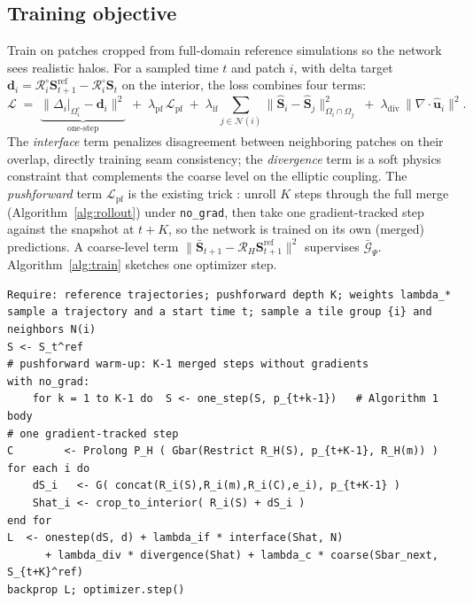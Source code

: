 \documentclass[11pt]{article}
\newcommand{\Rop}{\mathcal{R}}
\newcommand{\Gcoarse}{\bar{\mathcal{G}}_{\Psi}}
\begin{document}
\subsection{Training objective}
Train on patches cropped from full-domain reference simulations so the network
sees realistic halos. For a sampled time $t$ and patch $i$, with delta target
$\bm d_i = \Rop_i^\circ \bm S_{t+1}^{\text{ref}} - \Rop_i^\circ \bm S_t$ on the
interior, the loss combines four terms:
\begin{equation}
\mathcal L \;=\;
\underbrace{\big\| \Delta_i|_{\Omega_i^\circ} - \bm d_i \big\|^2}_{\text{one-step}}
\;+\; \lambda_{\mathrm{pf}}\,\mathcal L_{\mathrm{pf}}
\;+\; \lambda_{\mathrm{if}} \!\!\sum_{j\in\mathcal N(i)}\!\! \big\| \hat{\bm S}_i - \hat{\bm S}_j \big\|^2_{\Omega_i\cap\Omega_j}
\;+\; \lambda_{\mathrm{div}}\, \big\| \nabla\!\cdot\!\hat{\bm u}_i \big\|^2 .
\label{eq:loss}
\end{equation}
The \emph{interface} term penalizes disagreement between neighboring patches on
their overlap, directly training seam consistency; the \emph{divergence} term is
a soft physics constraint that complements the coarse level on the elliptic
coupling. The \emph{pushforward} term $\mathcal L_{\mathrm{pf}}$ is the existing
trick \cite{brandstetter2022mppde}: unroll $K$ steps through the full merge
(Algorithm~\ref{alg:rollout}) under \texttt{no\_grad}, then take one
gradient-tracked step against the snapshot at $t+K$, so the network is trained on
its own (merged) predictions. A coarse-level term
$\|\bar{\bm S}_{t+1}-\Rop_H\bm S_{t+1}^{\text{ref}}\|^2$ supervises $\Gcoarse$.
Algorithm~\ref{alg:train} sketches one optimizer step.

\begin{algorithm}[t]
\caption{One training step (patch-based, with pushforward and interface terms)}
\label{alg:train}
\begin{lstlisting}[style=pseudo]
Require: reference trajectories; pushforward depth K; weights lambda_*
sample a trajectory and a start time t; sample a tile group {i} and neighbors N(i)
S <- S_t^ref
# pushforward warm-up: K-1 merged steps without gradients
with no_grad:
    for k = 1 to K-1 do  S <- one_step(S, p_{t+k-1})   # Algorithm 1 body
# one gradient-tracked step
C        <- Prolong P_H ( Gbar(Restrict R_H(S), p_{t+K-1}, R_H(m)) )
for each i do
    dS_i   <- G( concat(R_i(S),R_i(m),R_i(C),e_i), p_{t+K-1} )
    Shat_i <- crop_to_interior( R_i(S) + dS_i )
end for
L  <- onestep(dS, d) + lambda_if * interface(Shat, N)
      + lambda_div * divergence(Shat) + lambda_c * coarse(Sbar_next, S_{t+K}^ref)
backprop L; optimizer.step()
\end{lstlisting}
\end{algorithm}
\end{document}
